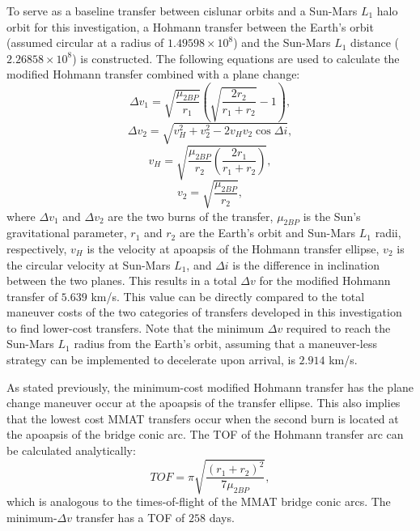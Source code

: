 To serve as a baseline transfer between cislunar orbits and a Sun-Mars $L_{1}$ halo orbit for this
investigation, a Hohmann transfer between the Earth's orbit (assumed circular at a radius of
$1.49598\times10^{8}$) and the Sun-Mars $L_{1}$ distance ($2.26858\times10^{8}$) is constructed.
The following equations are used to calculate the modified Hohmann transfer combined with a plane
change:
\begin{equation}
    \Delta v_{1}=\sqrt{\frac{\mu_{2BP}}{r_{1}}}(\sqrt{\frac{2r_{2}}{r_{1}+r_{2}}}-1),
    \label{eq:Hohmann1}
\end{equation}
\begin{equation}
    \Delta v_{2}=\sqrt{v_{H}^{2}+v_{2}^{2}-2v_{H}v_{2}\cos\Delta i},
    \label{eq:Hohmann2}
\end{equation}
\begin{equation}
    v_{H}=\sqrt{\frac{\mu_{2BP}}{r_{2}}(\frac{2r_{1}}{r_{1}+r_{2}})},
    \label{eq:transferv}
\end{equation}
\begin{equation}
    v_{2}=\sqrt{\frac{\mu_{2BP}}{r_{2}}},
    \label{eq:circlev}
\end{equation}
where $\Delta v_{1}$ and $\Delta v_{2}$ are the two burns of the transfer, $\mu_{2BP}$ is the Sun's
gravitational parameter, $r_{1}$ and $r_{2}$ are the Earth's orbit and Sun-Mars $L_{1}$ radii,
respectively, $v_{H}$ is the velocity at apoapsis of the Hohmann transfer ellipse, $v_{2}$ is the
circular velocity at Sun-Mars $L_{1}$, and $\Delta i$ is the difference in inclination between the
two planes. This results in a total $\Delta v$ for the modified Hohmann transfer of $5.639$ km/s.
This value can be directly compared to the total maneuver costs of the two categories of transfers
developed in this investigation to find lower-cost transfers. Note that the minimum $\Delta v$
required to reach the Sun-Mars $L_{1}$ radius from the Earth's orbit, assuming that a maneuver-less
strategy can be implemented to decelerate upon arrival, is $2.914$ km/s.

As stated previously, the minimum-cost modified Hohmann transfer has the plane change maneuver
occur at the apoapsis of the transfer ellipse. This also implies that the lowest cost MMAT
transfers occur when the second burn is located at the apoapsis of the bridge conic arc. The TOF of
the Hohmann transfer arc can be calculated analytically:
\begin{equation}
    TOF=\pi\sqrt{\frac{(r_{1}+r_{2})^{2}}{7\mu_{2BP}}},
    \label{eq:HohmannTOF}
\end{equation}
which is analogous to the times-of-flight of the MMAT bridge conic arcs. The minimum-$\Delta v$
transfer has a TOF of $258$ days.
